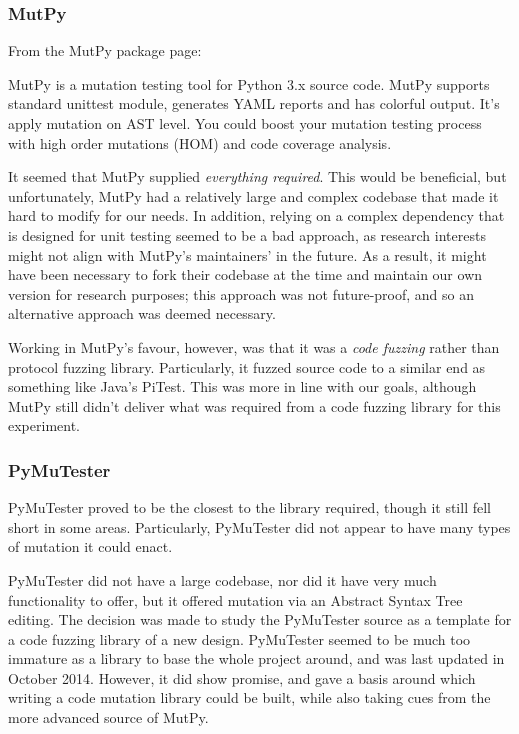 \subsubsection{MutPy} %
\label{fuzzing_mutpy}
From the MutPy package page: %
\begin{displayquote}
MutPy is a mutation testing tool for Python 3.x source code. MutPy supports standard unittest module, generates YAML reports and has colorful output. It’s apply mutation on AST level. You could boost your mutation testing process with high order mutations (HOM) and code coverage analysis.
\end{displayquote}\par
It seemed that MutPy supplied \emph{everything required}. This would be beneficial, but unfortunately, MutPy had a relatively large and complex codebase that made it hard to modify for our needs. In addition, relying on a complex dependency that is designed for unit testing seemed to be a bad approach, as research interests might not align with MutPy's maintainers' in the future. As a result, it might have been necessary to fork their codebase at the time and maintain our own version for research purposes; this approach was not future-proof, and so an alternative approach was deemed necessary. \par
Working in MutPy's favour, however, was that it was a \emph{code fuzzing} rather than protocol fuzzing library. Particularly, it fuzzed source code to a similar end as something like Java's PiTest. This was more in line with our goals, although MutPy still didn't deliver what was required from a code fuzzing library for this experiment. \par%

\subsubsection{PyMuTester}
\label{fuzzing_pymutester}
PyMuTester proved to be the closest to the library required, though it still fell short in some areas. Particularly, PyMuTester did not appear to have many types of mutation it could enact. \par
PyMuTester did not have a large codebase, nor did it have very much functionality to offer, but it offered mutation via an Abstract Syntax Tree editing. The decision was made to study the PyMuTester source as a template for a code fuzzing library of a new design. PyMuTester seemed to be much too immature as a library to base the whole project around, and was last updated in October 2014. However, it did show promise, and gave a basis around which writing a code mutation library could be built, while also taking cues from the more advanced source of MutPy.  \par%
